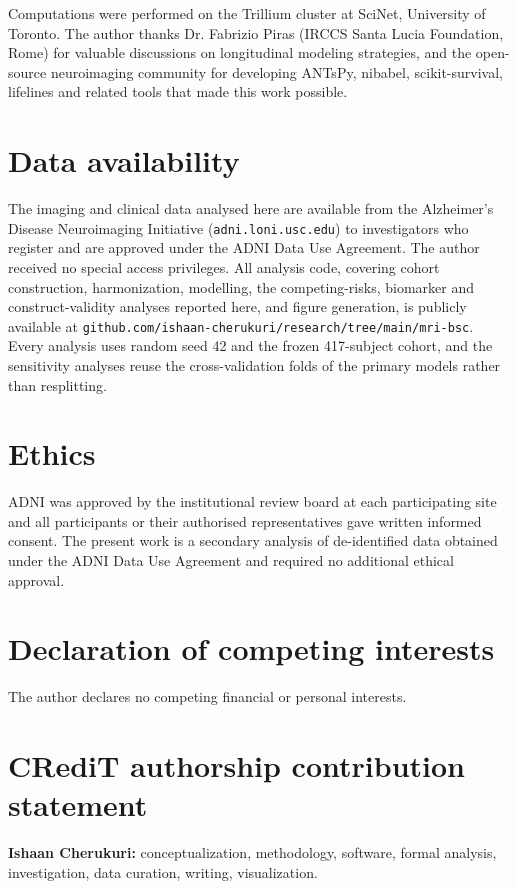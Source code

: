 \documentclass[blue]{ludusofficial}  %
\begin{document}
Computations were performed on the Trillium cluster at SciNet, University of Toronto. The author thanks Dr. Fabrizio Piras (IRCCS Santa Lucia Foundation, Rome) for valuable discussions on longitudinal modeling strategies, and the open-source neuroimaging community for developing ANTsPy, nibabel, scikit-survival, lifelines and related tools that made this work possible.

\section*{Data availability}

The imaging and clinical data analysed here are available from the Alzheimer's Disease Neuroimaging Initiative (\texttt{adni.loni.usc.edu}) to investigators who register and are approved under the ADNI Data Use Agreement. The author received no special access privileges. All analysis code, covering cohort construction, harmonization, modelling, the competing-risks, biomarker and construct-validity analyses reported here, and figure generation, is publicly available at \texttt{github.com/ishaan-cherukuri/research/tree/main/mri-bsc}. Every analysis uses random seed 42 and the frozen 417-subject cohort, and the sensitivity analyses reuse the cross-validation folds of the primary models rather than resplitting.


\section*{Ethics}

ADNI was approved by the institutional review board at each participating site and all participants or their authorised representatives gave written informed consent. The present work is a secondary analysis of de-identified data obtained under the ADNI Data Use Agreement and required no additional ethical approval.

\section*{Declaration of competing interests}

The author declares no competing financial or personal interests.

\section*{CRediT authorship contribution statement}

\textbf{Ishaan Cherukuri:} conceptualization, methodology, software, formal analysis, investigation, data curation, writing, visualization.



\end{document}
